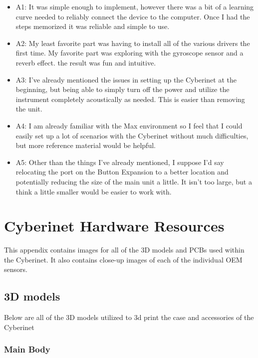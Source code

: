 \begin{itemize}
    \item A1: It was simple enough to implement, however there was a bit of a learning curve needed to reliably connect the device to the computer. Once I had the steps memorized it was reliable and simple to use.
    \item A2: My least favorite part was having to install all of the various drivers the first time. My favorite part was exploring with the gyroscope sensor and a reverb effect. the result was fun and intuitive.
    \item A3: I've already mentioned the issues in setting up the Cyberinet at the beginning, but being able to simply turn off the power and utilize the instrument completely acoustically as needed. This is easier than removing the unit.
    \item A4: I am already familiar with the Max environment so I feel that I could easily set up a lot of scenarios with the Cyberinet without much difficulties, but more reference material would be helpful. 
    \item A5: Other than the things I've already mentioned, I suppose I'd say relocating the port on the Button Expansion to a better location and potentially reducing the size of the main unit a little. It isn't too large, but a think a little smaller would be easier to work with.
\end{itemize}


\appendix

\chapter{Cyberinet Hardware Resources}
This appendix contains images for all of the 3D models and PCBs used within the Cyberinet. It also contains close-up images of each of the individual OEM sensors.

\section{3D models}
Below are all of the 3D models utilized to 3d print the case and accessories of the Cyberinet

\subsection{Main Body}

